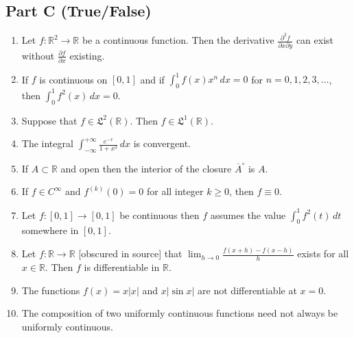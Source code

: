\documentclass[11pt, a4paper]{article}
\begin{document}
\subsection*{Part C (True/False)}
\begin{enumerate}[resume]
  \item Let $f: \mathbb{R}^2 \to \mathbb{R}$ be a continuous function. Then the derivative $\frac{\partial^2 f}{\partial x \partial y}$ can exist without $\frac{\partial f}{\partial x}$ existing.
  \item If $f$ is continuous on $[0, 1]$ and if $\int_0^1 f(x) x^n\,dx = 0$ for $n = 0, 1, 2, 3, \dots$, then $\int_0^1 f^2(x)\,dx = 0$.
  \item Suppose that $f \in \mathfrak{L}^2(\mathbb{R})$. Then $f \in \mathfrak{L}^1(\mathbb{R})$.
  \item The integral $\displaystyle \int_{-\infty}^{+\infty} \frac{e^{-x}}{1 + x^2}\,dx$ is convergent.
  \item If $A \subset \mathbb{R}$ and open then the interior of the closure $\overline{A}^\circ$ is $A$.
  \item If $f \in C^\infty$ and $f^{(k)}(0) = 0$ for all integer $k \ge 0$, then $f \equiv 0$.
  \item Let $f: [0, 1] \to [0, 1]$ be continuous then $f$ assumes the value $\int_0^1 f^2(t)\,dt$ somewhere in $[0, 1]$.
  \item Let $f: \mathbb{R} \to \mathbb{R}$ {[obscured in source]} that $\lim_{h \to 0} \frac{f(x + h) - f(x - h)}{h}$ exists for all $x \in \mathbb{R}$. Then $f$ is differentiable in $\mathbb{R}$.
  \item The functions $f(x) = x|x|$ and $x|\sin x|$ are not differentiable at $x = 0$.
  \item The composition of two uniformly continuous functions need not always be uniformly continuous.
\end{enumerate}
\end{document}
